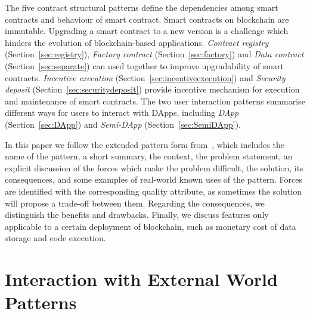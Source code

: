 The five contract structural patterns define the dependencies among smart contracts and behaviour of smart contract. Smart contracts on blockchain are immutable. Upgrading a smart contract to a new version is a challenge which hinders the evolution of blockchain-based applications. \textit{Contract registry} (Section~\ref{sec:registry}), \textit{Factory contract} (Section~\ref{sec:factory}) and \textit{Data contract} (Section~\ref{sec:separate}) can used together to improve upgradability of smart contracts. \textit{Incentive execution} (Section~\ref{sec:incentiveexecution}) and \textit{Security deposit} (Section~\ref{sec:securitydeposit}) provide incentive mechanism for execution and maintenance of smart contracts. The two user interaction patterns summarise different ways for users to interact with DApps, including \textit{DApp} (Section~\ref{sec:DApp}) and \textit{Semi-DApp} (Section~\ref{sec:SemiDApp}). 



In this paper we follow the extended pattern form from~\cite{meszaros1998pattern}, which includes the name of the pattern, a short summary, the context, the problem statement, an explicit discussion of the forces which make the problem difficult, the solution, its consequences, and some examples of real-world known uses of the pattern. %
Forces are identified with the corresponding quality attribute, as sometimes the solution will propose a trade-off between them. Regarding the consequences, we distinguish the benefits and drawbacks. Finally, we discuss features only applicable to a certain deployment of blockchain, such as monetary cost of data storage and code execution.

\section{Interaction with External World Patterns}
\label{sec:interactionPatttern}

